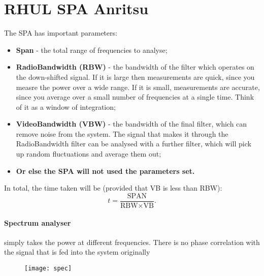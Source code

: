 \section{RHUL SPA Anritsu}
The SPA has important parameters:
\begin{itemize}
\item \textbf{Span} - the total range of frequencies to analyse;
\item \textbf{RadioBandwidth (RBW)}  - the bandwidth of the filter  which operates on the down-shifted signal.  If it is
  large then  measurements are quick, since  you measre the power  over a wide range.  If it is small,  measurements are
  accurate,  since you  average over  a small  number of  frequencies  at a  single time.  Think of  it as  a window  of
  integration;
\item \textbf{VideoBandwidth (VBW)}  - the bandwidth of  the final filter, which  can remove noise from  the system. The
  signal that  makes it through  the RadioBandwidth filter  can be analysed  with a further  filter, which will  pick up
  random fluctuations and average them out;
\item \textbf{ Or else the SPA will not used the parameters set.}
\end{itemize}

In total, the time taken will be (provided that VB is less than RBW):
\[
  t = \frac{\text{SPAN}}{\text{RBW}\times\text{VB}}.
\]


\paragraph{Spectrum analyser} simply  takes the power at different  frequencies. There is no phase  correlation with the
signal that is fed into the system originally
\begin{figure}[h]
  \texttt{[image: spec]}
\end{figure}
\newpage
